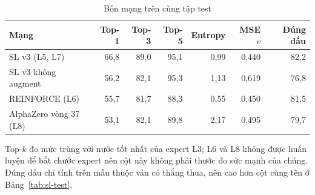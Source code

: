 \begin{table}[H]
  \centering
  \footnotesize
  \caption{Bốn mạng trên cùng tập test}
  \label{tab:cs-mang-tong}
  \begin{tabular}{lrrrrrr}
    \toprule
    Mạng & Top-1 & Top-3 & Top-5 & Entropy & MSE $v$ & Đúng dấu \\
    \midrule
    SL v3 (L5, L7) & 66,8 & 89,0 & 95,1 & 0,99 & 0,440 & 82,2 \\
    SL v3 không augment & 56,2 & 82,1 & 95,3 & 1,13 & 0,619 & 76,8 \\
    REINFORCE (L6) & 55,7 & 81,7 & 88,3 & 0,55 & 0,450 & 81,5 \\
    AlphaZero vòng 37 (L8) & 53,1 & 82,1 & 89,8 & 2,17 & 0,495 & 79,7 \\
    \bottomrule
  \end{tabular}
  \par\smallskip\parbox{.95\linewidth}{\footnotesize Top-$k$ đo mức trùng với nước tốt nhất của expert L3; L6 và L8 không được huấn luyện để bắt chước expert nên cột này không phải thước đo sức mạnh của chúng. Đúng dấu chỉ tính trên mẫu thuộc ván có thắng thua, nên cao hơn cột cùng tên ở Bảng~\ref{tab:sl-test}.}
\end{table}
